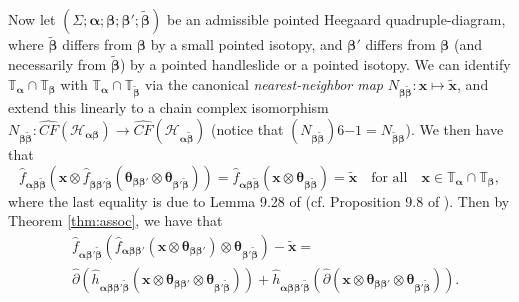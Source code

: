\documentclass[11pt]{article}
\theoremstyle{plain} \newtheorem{thm}{Theorem}[subsection]
\theoremstyle{plain} \newtheorem{cor}[thm]{Corollary}
\theoremstyle{plain} \newtheorem{prop}[thm]{Proposition}
\theoremstyle{plain} \newtheorem{conj}[thm]{Conjecture}
\theoremstyle{plain} \newtheorem{lem}[thm]{Lemma}
\theoremstyle{definition} \newtheorem{df}[thm]{Definition}
\theoremstyle{remark} \newtheorem{rmk}[thm]{Remark}
\theoremstyle{remark} \newtheorem{obs}[thm]{Observation}
\newcommand{\h}{\mathcal{H}}
\newcommand{\del}{\partial}
\newcommand{\tld}[1]{\widetilde{#1}}
\newcommand{\delh}{\widehat{\del}}
\newcommand{\ba}{\boldsymbol{\alpha}}
\newcommand{\bb}{\boldsymbol{\beta}}
\newcommand{\bbt}{\boldsymbol{\tld{\beta}}}
\newcommand{\Ta}{\mathbb{T}_{\ba}}
\newcommand{\Tb}{\mathbb{T}_{\bb}}
\newcommand{\bx}{\mathbf{x}}
\newcommand{\thet}[1]{\boldsymbol{\theta}_{#1}}
\newcommand{\tor}[1]{\mathbb{T}_{#1}}
\begin{document}
Now let $\left(\Sigma; \ba; \bb; \bb'; \bbt\right)$ be an admissible pointed Heegaard quadruple-diagram, where $\bbt$ differs from $\bb$ by a small pointed isotopy, and $\bb'$ differs from $\bb$ (and necessarily from $\bbt$) by a pointed handleslide or a pointed isotopy.  We can identify $\tor{\ba}\cap\tor{\bb}$ with $\tor{\ba}\cap \tor{\tld{\bb}}$ via the canonical \textit{nearest-neighbor map} $N_{\bb\tld{\bb}}:\bx \mapsto \tld{\bx}$, and extend this linearly to a chain complex isomorphism $N_{\bb \tld{\bb}}: \widehat{CF}(\h_{\ba \bb}) \rightarrow \widehat{CF}(\h_{\ba \tld{\bb}})$ (notice that $\left( N_{\bb \tld{\bb}} \right)6{-1} = N_{\tld{\bb} \bb} $).  We then have that
\begin{equation*}
\widehat{f}_{\ba\bb\bbt} \left( \bx \otimes \widehat{f}_{\bb\bb'\bbt} \left(  \thet{\bb\bb'} \otimes \thet{\bb'\bbt} \right) \right) =
\widehat{f}_{\ba\bb\bbt} \left( \bx \otimes \thet{\bb\bbt} \right) = \tld{\bx} \quad \text{for all} \quad \bx \in \Ta \cap \Tb,
\end{equation*}
where the last equality is due to Lemma 9.28 of \cite{jt:nat} (cf. Proposition 9.8 of \cite{os:disk}).
Then by Theorem \ref{thm:assoc}, we have that
\begin{align*}
&\widehat{f}_{\ba\bb'\bbt} \left( \widehat{f}_{\ba\bb\bb'} \left( \bx \otimes \thet{\bb\bb'} \right) \otimes \thet{\bb'\bbt} \right)
-  \tld{\bx}= \\
&\delh \left( \widehat{h}_{\ba\bb\bb'\bbt} \left(\bx \otimes \thet{\bb\bb'} \otimes \thet{\bb'\bbt} \right) \right)
+ \widehat{h}_{\ba\bb\bb'\bbt}  \left( \delh \left( \bx \otimes \thet{\bb\bb'} \otimes \thet{\bb'\bbt} \right) \right).
\end{align*}

\end{document}
